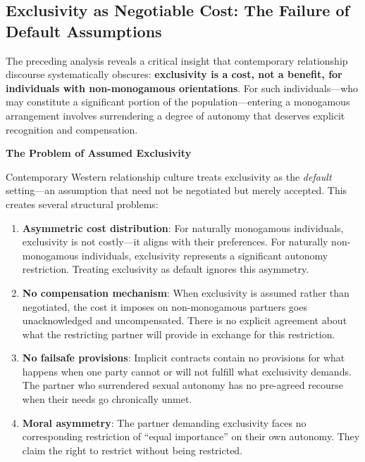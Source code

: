 \documentclass[12pt,openany]{book}
\numberwithin{equation}{chapter}
\begin{document}
\subsection{Exclusivity as Negotiable Cost: The Failure of Default Assumptions}

The preceding analysis reveals a critical insight that contemporary relationship discourse systematically obscures: \textbf{exclusivity is a cost, not a benefit, for individuals with non-monogamous orientations}. For such individuals---who may constitute a significant portion of the population---entering a monogamous arrangement involves surrendering a degree of autonomy that deserves explicit recognition and compensation.

\textbf{The Problem of Assumed Exclusivity}

Contemporary Western relationship culture treats exclusivity as the \textit{default} setting---an assumption that need not be negotiated but merely accepted. This creates several structural problems:

\begin{enumerate}
    \item \textbf{Asymmetric cost distribution}: For naturally monogamous individuals, exclusivity is not costly---it aligns with their preferences. For naturally non-monogamous individuals, exclusivity represents a significant autonomy restriction. Treating exclusivity as default ignores this asymmetry.
    
    \item \textbf{No compensation mechanism}: When exclusivity is assumed rather than negotiated, the cost it imposes on non-monogamous partners goes unacknowledged and uncompensated. There is no explicit agreement about what the restricting partner will provide in exchange for this restriction.
    
    \item \textbf{No failsafe provisions}: Implicit contracts contain no provisions for what happens when one party cannot or will not fulfill what exclusivity demands. The partner who surrendered sexual autonomy has no pre-agreed recourse when their needs go chronically unmet.
    
    \item \textbf{Moral asymmetry}: The partner demanding exclusivity faces no corresponding restriction of ``equal importance'' on their own autonomy. They claim the right to restrict without being restricted.
\end{enumerate}
\end{document}
